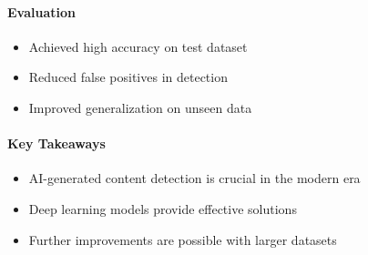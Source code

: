 
{
	\framesubtitle{Evaluation}
	
	\begin{itemize}
		\item Achieved high accuracy on test dataset
		\item Reduced false positives in detection
		\item Improved generalization on unseen data
	\end{itemize}
}


{
	\framesubtitle{Key Takeaways}
	
	\begin{itemize}
		\item AI-generated content detection is crucial in the modern era
		\item Deep learning models provide effective solutions
		\item Further improvements are possible with larger datasets
	\end{itemize}
}